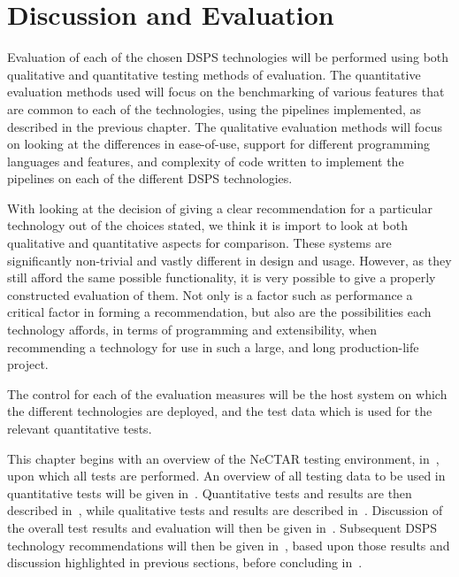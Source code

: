 \chapter{Discussion and Evaluation}
\label{sec:evaluation}

Evaluation of each of the chosen DSPS technologies will be performed using both qualitative and quantitative testing methods
of evaluation. The quantitative evaluation methods used will focus on the benchmarking of various features that are common
to each of the technologies, using the pipelines implemented, as described in the previous chapter.
The qualitative evaluation methods will focus on looking at the differences in ease-of-use,
support for different programming languages and features, and complexity of code written to implement the pipelines on
each of the different DSPS technologies.

With looking at the decision of giving a clear recommendation for a particular technology out of the choices stated,
we think it is import to look at both qualitative and quantitative aspects for comparison. These systems are significantly
non-trivial and vastly different in design and usage. However, as they still afford the same possible functionality,
it is very possible to give a properly constructed evaluation of them. Not only is a factor such as performance a critical
factor in forming a recommendation, but also are the possibilities each technology affords, in terms of programming and
extensibility, when recommending a technology for use in such a large, and long production-life project.

The control for each of the evaluation measures will be the host system on which the different technologies are deployed,
and the test data which is used for the relevant quantitative tests.

This chapter begins with an overview of the NeCTAR testing environment, in~, upon which
all tests are performed. An overview of all testing data to be used in quantitative tests will be given in~.
Quantitative tests and results are then described in~,
while qualitative tests and results are described in~. Discussion of the
overall test results and evaluation will then be given in~. Subsequent DSPS technology recommendations will then be given in~,
based upon those results and discussion highlighted in previous sections, before concluding in~.


